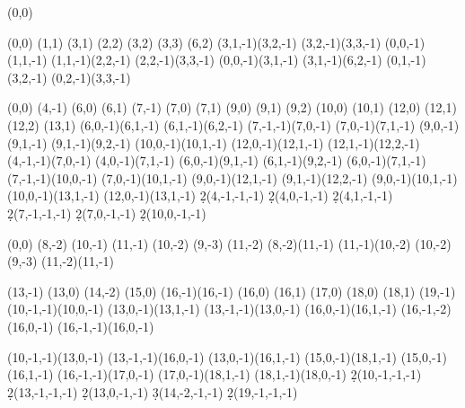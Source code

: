 \documentclass[tooltips]{spectralsequence-example}
\begin{document}
\NewSseqGroup\tower {} {%
    \class(0,0)
}

\NewSseqGroup\towergroup {} {%
    \tower(0,0)
    \class(1,1)
    \class(3,1)
    \class(2,2)
    \class(3,2)
    \class(3,3)
    \class(6,2)
    \structline(3,1,-1)(3,2,-1)
    \structline(3,2,-1)(3,3,-1)
    \structline(0,0,-1)(1,1,-1)
    \structline(1,1,-1)(2,2,-1)
    \structline(2,2,-1)(3,3,-1)
    \structline(0,0,-1)(3,1,-1)
    \structline(3,1,-1)(6,2,-1)
    \structline(0,1,-1)(3,2,-1)
    \structline(0,2,-1)(3,3,-1)
}


\NewSseqGroup\towergroupa {} {%
    \towergroup(0,0)
    \tower(4,-1)
%
    \class(6,0)
    \class(6,1)
    \class(7,-1)
    \class(7,0)
    \class(7,1)
    \class(9,0)
    \class(9,1)
    \class(9,2)
    \class(10,0)
    \class(10,1)
    \class(12,0)
    \class(12,1)
    \class(12,2)
    \class(13,1)
    \structline(6,0,-1)(6,1,-1)
    \structline(6,1,-1)(6,2,-1)
    \structline(7,-1,-1)(7,0,-1)
    \structline(7,0,-1)(7,1,-1)
    \structline(9,0,-1)(9,1,-1)
    \structline(9,1,-1)(9,2,-1)
    \structline(10,0,-1)(10,1,-1)
    \structline(12,0,-1)(12,1,-1)
    \structline(12,1,-1)(12,2,-1)
%
    \structline(4,-1,-1)(7,0,-1)
    \structline(4,0,-1)(7,1,-1)
    \structline(6,0,-1)(9,1,-1)
    \structline(6,1,-1)(9,2,-1)
    \structline(6,0,-1)(7,1,-1)
    \structline(7,-1,-1)(10,0,-1)
    \structline(7,0,-1)(10,1,-1)
    \structline(9,0,-1)(12,1,-1)
    \structline(9,1,-1)(12,2,-1)
    \structline(9,0,-1)(10,1,-1)
    \structline(10,0,-1)(13,1,-1)
    \structline(12,0,-1)(13,1,-1)
%
    \d2(4,-1,-1,-1)
    \d2(4,0,-1,-1)
    \d2(4,1,-1,-1)
    \d2(7,-1,-1,-1)
    \d2(7,0,-1,-1)
    \d2(10,0,-1,-1)
}

\NewSseqGroup\towergroupb {} {%
    \towergroupa(0,0)
    \tower(8,-2)
    \class(10,-1)
    \class(11,-1)
    \class(10,-2)
    \class(9,-3)
    \class(11,-2)
    \structline(8,-2)(11,-1)
    \structline(11,-1)(10,-2)
    \structline(10,-2)(9,-3)
    \structline(11,-2)(11,-1)

    \class(13,-1)
    \class(13,0)
    \class(14,-2)
    \class(15,0)
    \class(16,-1)\class(16,-1)
    \class(16,0)
    \class(16,1)
    \class(17,0)
    \class(18,0)
    \class(18,1)
    \class(19,-1)
    \structline(10,-1,-1)(10,0,-1)
    \structline(13,0,-1)(13,1,-1)
    \structline(13,-1,-1)(13,0,-1)
    \structline(16,0,-1)(16,1,-1)
    \structline(16,-1,-2)(16,0,-1)
    \structline(16,-1,-1)(16,0,-1)

    \structline(10,-1,-1)(13,0,-1)
    \structline(13,-1,-1)(16,0,-1)
    \structline(13,0,-1)(16,1,-1)
    \structline(15,0,-1)(18,1,-1)
    \structline(15,0,-1)(16,1,-1)
    \structline(16,-1,-1)(17,0,-1)
    \structline(17,0,-1)(18,1,-1)
    \structline(18,1,-1)(18,0,-1)
    \d2(10,-1,-1,-1)
    \d2(13,-1,-1,-1)
    \d2(13,0,-1,-1)
    \d3(14,-2,-1,-1)
    \d2(19,-1,-1,-1)
}
\end{document}
